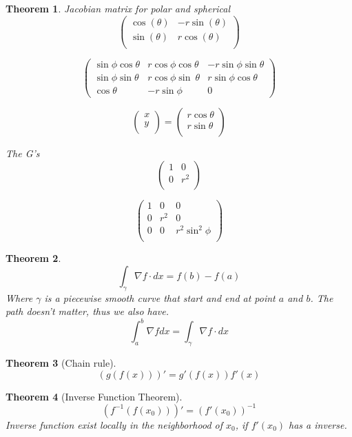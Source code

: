 \documentclass[letter]{article}
\newtheorem{theorem}{Theorem}[section]
\begin{document}
\begin{theorem}
Jacobian matrix for polar and spherical
\[
\left( \begin{array}{cc}
\cos(\theta) & -r\sin(\theta) \\
\sin(\theta) & r\cos(\theta) \\
\end{array} \right)
\]

\[ \left( \begin{array}{ccc}
\sin \phi \cos \theta & r \cos \phi \cos \theta & -r\sin \phi \sin \theta \\
\sin \phi \sin \theta & r\cos \phi \sin \ \theta & r\sin \phi \cos \theta \\
\cos \theta & -r\sin \phi & 0 \end{array} \right)\] 

\[
\left( \begin{array}{c}
x\\
y\\
\end{array} \right) = 
\left( \begin{array}{c}
r \cos \theta\\
r \sin \theta\\ \end{array} \right)
\]

The G's
\[
\left( \begin{array}{cc}
1&0\\
0&r^2\\
\end{array} \right)
\]

\[
\left( \begin{array}{ccc}
1&0&0\\
0&r^2&0\\
0&0&r^2 \sin^2\phi\\
\end{array} \right)
\]
\end{theorem}

\begin{theorem}
\[\int_\gamma \nabla f \cdot dx = f(b) - f(a)\]
Where $\gamma$ is a piecewise smooth curve that start and end at point $a$ and $b$. The path doesn't matter, thus we also have.
\[\int_a^b \nabla f dx = \int_\gamma \nabla f \cdot dx\]
\end{theorem}

\begin{theorem}[Chain rule]
\[(g(f(x)))' = g'(f(x))f '(x)\]
\end{theorem}

\begin{theorem}[Inverse Function Theorem]
\[(f^{-1}(f(x_0)))' = (f'(x_0))^{-1}\]
Inverse function exist locally in the neighborhood of $x_0$, if $f'(x_0)$ has a inverse.
\end{theorem}
\end{document}

